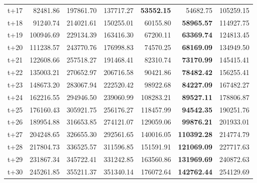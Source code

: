 \begin{table}[H]
\begin{tabular}{lrrrrrr}
t+17  & 82481.86  & 197861.70  & 137717.27  & \textbf{53552.15}  & 54682.75  & 105259.15  \\
t+18  & 91240.74  & 214021.61  & 150255.01  & 60155.80  & \textbf{58965.57}  & 114927.75  \\
t+19  & 100946.69  & 229134.39  & 163416.30  & 67200.11  & \textbf{63369.74}  & 124813.45  \\
t+20  & 111238.57  & 243770.76  & 176998.83  & 74570.25  & \textbf{68169.09}  & 134949.50  \\
t+21  & 122608.66  & 257518.27  & 191468.41  & 82310.74  & \textbf{73170.99}  & 145415.41  \\
t+22  & 135003.21  & 270652.97  & 206716.58  & 90421.86  & \textbf{78482.42}  & 156255.41  \\
t+23  & 148673.20  & 283067.94  & 222520.42  & 98922.68  & \textbf{84227.09}  & 167482.27  \\
t+24  & 162216.55  & 294946.50  & 239060.99  & 108283.21  & \textbf{89527.11}  & 178806.87  \\
t+25  & 176160.43  & 305921.75  & 256176.27  & 118457.99  & \textbf{94542.35}  & 190251.76  \\
t+26  & 189954.88  & 316653.85  & 274121.07  & 129059.06  & \textbf{99876.21}  & 201933.01  \\
t+27  & 204248.65  & 326655.30  & 292561.65  & 140016.05  & \textbf{110392.28}  & 214774.79  \\
t+28  & 217804.73  & 336525.57  & 311596.85  & 151591.91  & \textbf{121069.09}  & 227717.63  \\
t+29  & 231867.34  & 345722.41  & 331242.85  & 163560.86  & \textbf{131969.69}  & 240872.63  \\
t+30  & 245261.85  & 355211.37  & 351340.14  & 176072.64  & \textbf{142762.44}  & 254129.69  \\

\bottomrule
\end{tabular}
\end{table}
